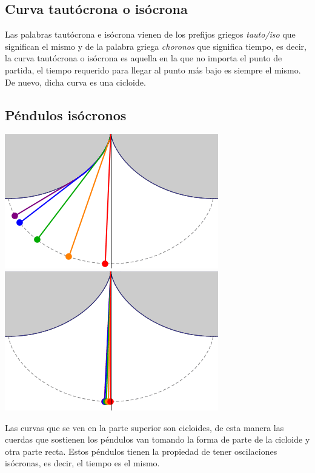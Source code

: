 \documentclass{article}
\begin{document}
\subsection{Curva tautócrona o isócrona}
Las palabras tautócrona e isócrona vienen de los prefijos griegos \textit{tauto/iso} que significan el mismo y de la palabra griega
\textit{choronos} que significa tiempo, es decir, la curva tautócrona o isócrona es aquella en la que no importa el punto de partida,
el tiempo requerido para llegar al punto más bajo es siempre el mismo. De nuevo, dicha curva es una cicloide.
\subsection{Péndulos isócronos}
\begin{center}
    \includegraphics[scale=0.5]{figuras/pend 1.PNG}\\
    \includegraphics[scale=0.5]{figuras/pend 2.PNG}
\end{center}
Las curvas que se ven en la parte superior son cicloides, de esta manera las cuerdas que sostienen los péndulos van tomando la
forma de parte de la cicloide y otra parte recta. Estos péndulos tienen la propiedad de tener oscilaciones isócronas, es decir,
el tiempo es el mismo.
\end{document}
